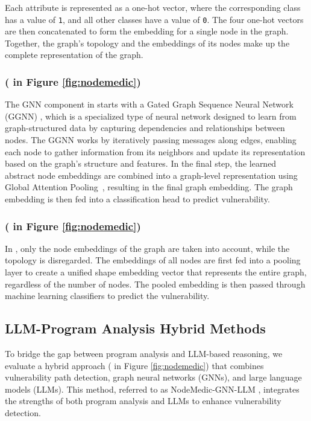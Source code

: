 \documentclass[12pt,openany,oneside,table]{cmuthesis}
\begin{document}
Each attribute is represented as a one-hot vector, where the corresponding class has a value of \texttt{1}, and all other classes have a value of \texttt{0}. The four one-hot vectors are then concatenated to form the embedding for a single node in the graph. Together, the graph's topology and the embeddings of its nodes make up the complete representation of the graph.

\subsubsection{ \textup{( in Figure \ref{fig:nodemedic})}}

The GNN component in  starts with a Gated Graph Sequence Neural Network (GGNN) \cite{li2015gated}, which is a specialized type of neural network designed to learn from graph-structured data by capturing dependencies and relationships between nodes. The GGNN works by iteratively passing messages along edges, enabling each node to gather information from its neighbors and update its representation based on the graph’s structure and features. In the final step, the learned abstract node embeddings are combined into a graph-level representation using Global Attention Pooling~\cite{li2015gated}, resulting in the final graph embedding. The graph embedding is then fed into a classification head to predict vulnerability.\sloppy



\subsubsection{ \textup{( in Figure \ref{fig:nodemedic})}}

In , only the node embeddings of the graph are taken into account, while the topology is disregarded. The embeddings of all nodes are first fed into a pooling layer to create a unified shape embedding vector that represents the entire graph, regardless of the number of nodes. The pooled embedding is then passed through machine learning classifiers to predict the vulnerability.

\subsection{LLM-Program Analysis Hybrid Methods}\label{subsec:hybrid_methods}

To bridge the gap between program analysis and LLM-based reasoning, we evaluate a hybrid approach \textup{( in Figure \ref{fig:nodemedic})} that combines  vulnerability path detection, graph neural networks (GNNs), and large language models (LLMs). This method, referred to as NodeMedic-GNN-LLM , integrates the strengths of both program analysis and LLMs to enhance vulnerability detection. 
\end{document}
